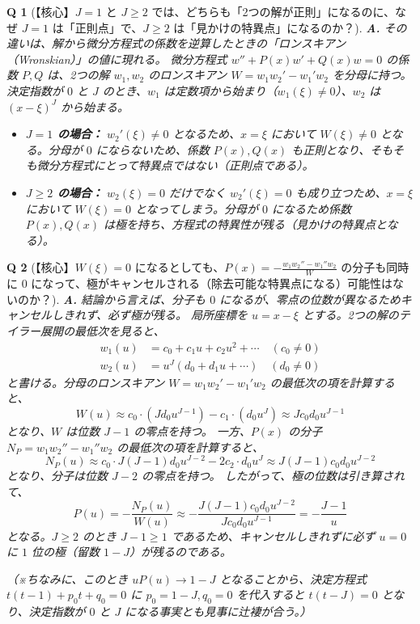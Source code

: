 \documentclass[paper=a4, fontsize=11pt]{jlreq} %
\theoremstyle{break}
\theoremstyle{qa}
\newtheorem*{Q}{Q}
\theoremstyle{remark} %
\begin{document}
\begin{Q}[【核心】$J=1$ と $J \ge 2$ では、どちらも「2つの解が正則」になるのに、なぜ $J=1$ は「正則点」で、$J \ge 2$ は「見かけの特異点」になるのか？]
\textbf{A.} その違いは、解から微分方程式の係数を逆算したときの「ロンスキアン（Wronskian）」の値に現れる。
微分方程式 $w'' + P(x)w' + Q(x)w = 0$ の係数 $P, Q$ は、2つの解 $w_{1}, w_{2}$ のロンスキアン $W = w_{1}w_{2}' - w_{1}'w_{2}$ を分母に持つ。
決定指数が $0$ と $J$ のとき、$w_{1}$ は定数項から始まり（$w_{1}(\xi) \neq 0$）、$w_{2}$ は $(x-\xi)^{J}$ から始まる。
\begin{itemize}
    \item \textbf{$J=1$ の場合：} $w_{2}'(\xi) \neq 0$ となるため、$x=\xi$ において $W(\xi) \neq 0$ となる。分母が $0$ にならないため、係数 $P(x), Q(x)$ も正則となり、そもそも微分方程式にとって特異点ではない（正則点である）。
    \item \textbf{$J \ge 2$ の場合：} $w_{2}(\xi) = 0$ だけでなく $w_{2}'(\xi) = 0$ も成り立つため、$x=\xi$ において $W(\xi) = 0$ となってしまう。分母が $0$ になるため係数 $P(x), Q(x)$ は極を持ち、方程式の特異性が残る（見かけの特異点となる）。
\end{itemize}
\end{Q}

\begin{Q}[【核心】$W(\xi)=0$ になるとしても、$P(x) = -\frac{w_{1}w_{2}'' - w_{1}''w_{2}}{W}$ の分子も同時に $0$ になって、極がキャンセルされる（除去可能な特異点になる）可能性はないのか？]
\textbf{A.} 結論から言えば、分子も $0$ になるが、零点の位数が異なるためキャンセルしきれず、必ず極が残る。
局所座標を $u = x-\xi$ とする。2つの解のテイラー展開の最低次を見ると、
\begin{align*}
w_{1}(u) &= c_{0} + c_{1}u + c_{2}u^{2} + \cdots \quad (c_{0} \neq 0) \\
w_{2}(u) &= u^{J}(d_{0} + d_{1}u + \cdots) \quad (d_{0} \neq 0)
\end{align*}
と書ける。分母のロンスキアン $W = w_{1}w_{2}' - w_{1}'w_{2}$ の最低次の項を計算すると、
\[
W(u) \approx c_{0} \cdot (J d_{0} u^{J-1}) - c_{1} \cdot (d_{0} u^{J}) \approx J c_{0} d_{0} u^{J-1}
\]
となり、$W$ は位数 $J-1$ の零点を持つ。
一方、$P(x)$ の分子 $N_{P} = w_{1}w_{2}'' - w_{1}''w_{2}$ の最低次の項を計算すると、
\[
N_{P}(u) \approx c_{0} \cdot J(J-1)d_{0}u^{J-2} - 2c_{2} \cdot d_{0}u^{J} \approx J(J-1)c_{0}d_{0}u^{J-2}
\]
となり、分子は位数 $J-2$ の零点を持つ。
したがって、極の位数は引き算されて、
\[
P(u) = -\frac{N_{P}(u)}{W(u)} \approx -\frac{J(J-1)c_{0}d_{0}u^{J-2}}{J c_{0} d_{0} u^{J-1}} = -\frac{J-1}{u}
\]
となる。$J \ge 2$ のとき $J-1 \ge 1$ であるため、キャンセルしきれずに必ず $u=0$ に $1$ 位の極（留数 $1-J$）が残るのである。

（※ちなみに、このとき $u P(u) \to 1-J$ となることから、決定方程式 $t(t-1) + p_{0}t + q_{0} = 0$ に $p_{0} = 1-J, q_{0} = 0$ を代入すると $t(t-J) = 0$ となり、決定指数が $0$ と $J$ になる事実とも見事に辻褄が合う。）
\end{Q}
\end{document}
